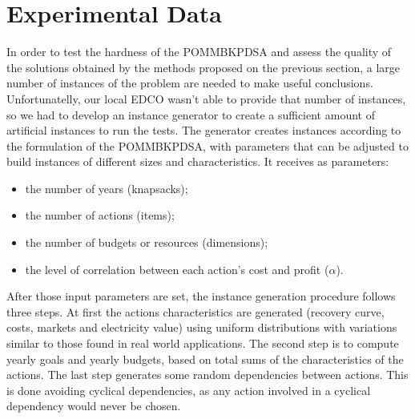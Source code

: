 \section{Experimental Data}
\label{sec:exp_data}

In order to test the hardness of the POMMBKPDSA and assess the quality of the solutions obtained by the methods 
proposed on the previous section, a large number of instances of the problem are needed to make useful 
conclusions. Unfortunatelly, our local EDCO wasn't able to provide that number of instances, so we had 
to develop an instance generator to create a sufficient amount of artificial instances to run the tests. 
The generator creates instances according to the formulation of the POMMBKPDSA, with parameters that can be 
adjusted to build instances of different sizes and characteristics. It receives as parameters:
\begin{itemize}
  \item the number of years (knapsacks);
  \item the number of actions (items);
  \item the number of budgets or resources (dimensions);
  \item the level of correlation between each action's cost and profit ($\alpha$).
\end{itemize}
After those input parameters are set, the instance generation procedure follows three steps.
At first the actions characteristics are generated (recovery curve, costs, markets and electricity value)
using uniform distributions with variations similar to those found in real world applications.
The second step is to compute yearly goals and yearly budgets,
based on total sums of the characteristics of the actions.
The last step generates some random dependencies between actions.
This is done avoiding cyclical dependencies, as any action involved in a cyclical 
dependency would never be chosen.


